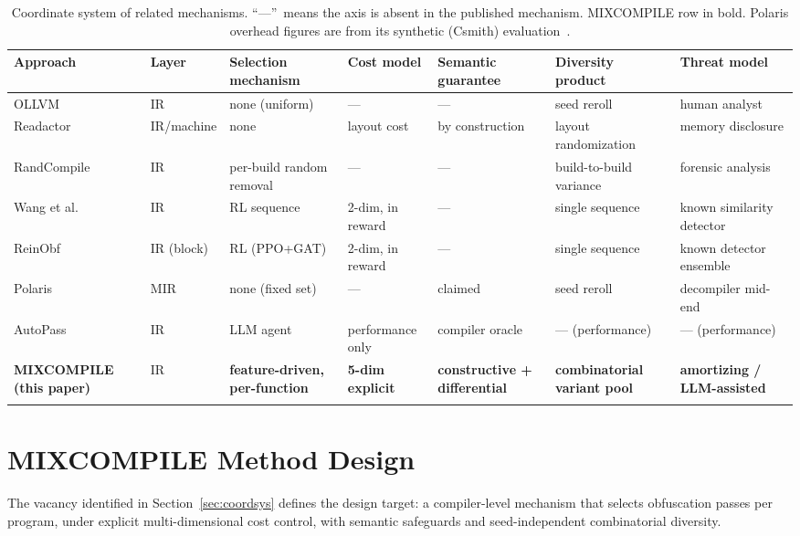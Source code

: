 \documentclass[pdflatex,sn-mathphys-num]{sn-jnl}
\theoremstyle{thmstyleone}%
\theoremstyle{thmstyletwo}%
\theoremstyle{thmstylethree}%
\begin{document}
\begin{table}[!t]
\centering
\footnotesize
\caption{Coordinate system of related mechanisms. ``---''~means the axis is absent in
the published mechanism. MIXCOMPILE row in bold. Polaris overhead figures are from its
synthetic (Csmith) evaluation~\cite{zhou2026polaris}.}
\label{tab:coordsys}
\begin{tabular}{lllllll}
\toprule
Approach & Layer & Selection mechanism & Cost model & Semantic guarantee & Diversity product & Threat model \\
\midrule
OLLVM~\cite{bib8} & IR & none (uniform) & --- & --- & seed reroll & human analyst \\
Readactor~\cite{crane2015readactor} & IR/machine & none & layout cost & by construction & layout randomization & memory disclosure \\
RandCompile~\cite{franzen2023randcompile} & IR & per-build random removal & --- & --- & build-to-build variance & forensic analysis \\
Wang et al.~\cite{bib4} & IR & RL sequence & 2-dim, in reward & --- & single sequence & known similarity detector \\
ReinObf~\cite{wei2025reinobf} & IR (block) & RL (PPO+GAT) & 2-dim, in reward & --- & single sequence & known detector ensemble \\
Polaris~\cite{zhou2026polaris} & MIR & none (fixed set) & --- & claimed & seed reroll & decompiler mid-end \\
AutoPass~\cite{li2026autopass} & IR & LLM agent & performance only & compiler oracle & --- (performance) & --- (performance) \\
\textbf{MIXCOMPILE (this paper)} & IR & \textbf{feature-driven, per-function} & \textbf{5-dim explicit} & \textbf{constructive + differential} & \textbf{combinatorial variant pool} & \textbf{amortizing / LLM-assisted} \\
\botrule
\end{tabular}
\end{table}

\section{MIXCOMPILE Method Design}
\label{sec:method}

The vacancy identified in Section~\ref{sec:coordsys} defines the design target: a
compiler-level mechanism that selects obfuscation passes per program, under explicit
multi-dimensional cost control, with semantic safeguards and seed-independent
combinatorial diversity.
\end{document}
